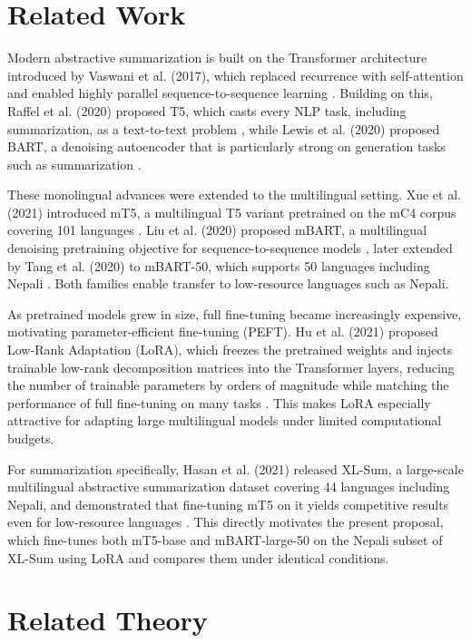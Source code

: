 \documentclass[12pt]{report}
\begin{document}
\section{Related Work}
Modern abstractive summarization is built on the Transformer architecture introduced by Vaswani et al. (2017), which replaced recurrence with self-attention and enabled highly parallel sequence-to-sequence learning \cite{vaswani2017attention}. Building on this, Raffel et al. (2020) proposed T5, which casts every NLP task, including summarization, as a text-to-text problem \cite{raffel2020exploring}, while Lewis et al. (2020) proposed BART, a denoising autoencoder that is particularly strong on generation tasks such as summarization \cite{lewis2020bart}.

These monolingual advances were extended to the multilingual setting. Xue et al. (2021) introduced mT5, a multilingual T5 variant pretrained on the mC4 corpus covering 101 languages \cite{xue2021mt5}. Liu et al. (2020) proposed mBART, a multilingual denoising pretraining objective for sequence-to-sequence models \cite{liu2020multilingual}, later extended by Tang et al. (2020) to mBART-50, which supports 50 languages including Nepali \cite{tang2020multilingual}. Both families enable transfer to low-resource languages such as Nepali.

As pretrained models grew in size, full fine-tuning became increasingly expensive, motivating parameter-efficient fine-tuning (PEFT). Hu et al. (2021) proposed Low-Rank Adaptation (LoRA), which freezes the pretrained weights and injects trainable low-rank decomposition matrices into the Transformer layers, reducing the number of trainable parameters by orders of magnitude while matching the performance of full fine-tuning on many tasks \cite{hu2021lora}. This makes LoRA especially attractive for adapting large multilingual models under limited computational budgets.

For summarization specifically, Hasan et al. (2021) released XL-Sum, a large-scale multilingual abstractive summarization dataset covering 44 languages including Nepali, and demonstrated that fine-tuning mT5 on it yields competitive results even for low-resource languages \cite{hasan2021xlsum}. This directly motivates the present proposal, which fine-tunes both mT5-base and mBART-large-50 on the Nepali subset of XL-Sum using LoRA and compares them under identical conditions.

\section{Related Theory}
\end{document}
